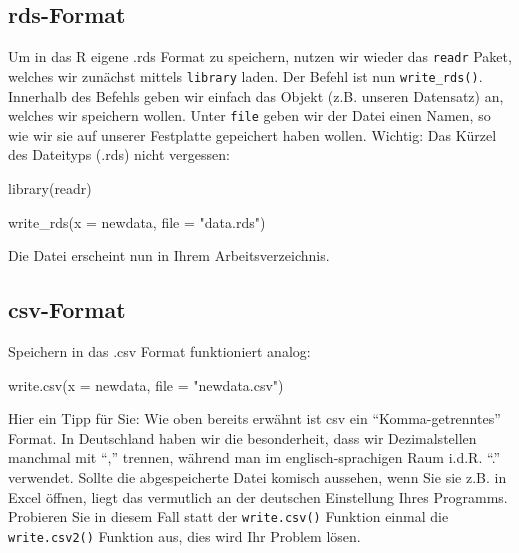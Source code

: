 \documentclass[
]{book}
\newenvironment{Shaded}{\begin{snugshade}}{\end{snugshade}}
\newcommand{\AttributeTok}[1]{\textcolor[rgb]{0.77,0.63,0.00}{#1}}
\newcommand{\FunctionTok}[1]{\textcolor[rgb]{0.00,0.00,0.00}{#1}}
\newcommand{\NormalTok}[1]{#1}
\newcommand{\StringTok}[1]{\textcolor[rgb]{0.31,0.60,0.02}{#1}}
\begin{document}
\hypertarget{rds-format-1}{%
\subsection{rds-Format}\label{rds-format-1}}

Um in das R eigene .rds Format zu speichern, nutzen wir wieder das \texttt{readr} Paket, welches wir zunächst mittels \texttt{library} laden. Der Befehl ist nun \texttt{write\_rds()}. Innerhalb des Befehls geben wir einfach das Objekt (z.B. unseren Datensatz) an, welches wir speichern wollen. Unter \texttt{file} geben wir der Datei einen Namen, so wie wir sie auf unserer Festplatte gepeichert haben wollen. Wichtig: Das Kürzel des Dateityps (.rds) nicht vergessen:

\begin{Shaded}
\begin{Highlighting}[]
\FunctionTok{library}\NormalTok{(readr)}

\FunctionTok{write\_rds}\NormalTok{(}\AttributeTok{x =}\NormalTok{ newdata, }\AttributeTok{file =} \StringTok{"data.rds"}\NormalTok{)}
\end{Highlighting}
\end{Shaded}

Die Datei erscheint nun in Ihrem Arbeitsverzeichnis.

\hypertarget{csv-format-1}{%
\subsection{csv-Format}\label{csv-format-1}}

Speichern in das .csv Format funktioniert analog:

\begin{Shaded}
\begin{Highlighting}[]
\FunctionTok{write.csv}\NormalTok{(}\AttributeTok{x =}\NormalTok{ newdata, }\AttributeTok{file =} \StringTok{"newdata.csv"}\NormalTok{)}
\end{Highlighting}
\end{Shaded}

Hier ein Tipp für Sie: Wie oben bereits erwähnt ist csv ein ``Komma-getrenntes'' Format. In Deutschland haben wir die besonderheit, dass wir Dezimalstellen manchmal mit ``,'' trennen, während man im englisch-sprachigen Raum i.d.R. ``.'' verwendet. Sollte die abgespeicherte Datei komisch aussehen, wenn Sie sie z.B. in Excel öffnen, liegt das vermutlich an der deutschen Einstellung Ihres Programms. Probieren Sie in diesem Fall statt der \texttt{write.csv()} Funktion einmal die \texttt{write.csv2()} Funktion aus, dies wird Ihr Problem lösen.
\end{document}

